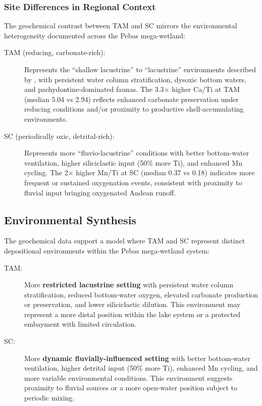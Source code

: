 \subsubsection{Site Differences in Regional Context}

The geochemical contrast between TAM and SC mirrors the environmental heterogeneity documented across the Pebas mega-wetland:

\begin{description}
\item[TAM (reducing, carbonate-rich):] Represents the ``shallow lacustrine'' to ``lacustrine'' environments described by \citet{Wesselingh2002}, with persistent water column stratification, dysoxic bottom waters, and pachydontine-dominated faunas. The 3.3$\times$ higher Ca/Ti at TAM (median 5.04 vs 2.94) reflects enhanced carbonate preservation under reducing conditions and/or proximity to productive shell-accumulating environments.

\item[SC (periodically oxic, detrital-rich):] Represents more ``fluvio-lacustrine'' conditions with better bottom-water ventilation, higher siliciclastic input (50\% more Ti), and enhanced Mn cycling. The 2$\times$ higher Mn/Ti at SC (median 0.37 vs 0.18) indicates more frequent or sustained oxygenation events, consistent with proximity to fluvial input bringing oxygenated Andean runoff.
\end{description}

\subsection{Environmental Synthesis}

The geochemical data support a model where TAM and SC represent distinct depositional environments within the Pebas mega-wetland system:

\begin{description}
\item[TAM:] More \textbf{restricted lacustrine setting} with persistent water column stratification, reduced bottom-water oxygen, elevated carbonate production or preservation, and lower siliciclastic dilution. This environment may represent a more distal position within the lake system or a protected embayment with limited circulation.

\item[SC:] More \textbf{dynamic fluvially-influenced setting} with better bottom-water ventilation, higher detrital input (50\% more Ti), enhanced Mn cycling, and more variable environmental conditions. This environment suggests proximity to fluvial sources or a more open-water position subject to periodic mixing.
\end{description}

